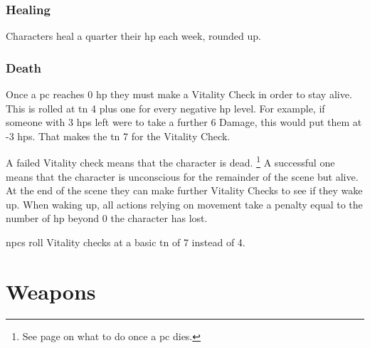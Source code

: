 \begin{multicols}{2}
\subsubsection{Healing}
Characters heal a quarter their \gls{hp} each week, rounded up.

\subsubsection{Death}
Once a \gls{pc} reaches 0 \gls{hp} they must make a Vitality Check in order to stay alive.
This is rolled at \gls{tn} 4 plus one for every negative \gls{hp} level.\iftoggle{verbose}{\footnote{Traits such as Strength do not affect the Vitality check because in a way, they already have.
Stronger characters already have more \gls{hp}, which has already kept them farther from death.}}{}
For example, if someone with 3 \glspl{hp} left were to take a further 6 Damage, this would put them at -3 \glspl{hp}.
That makes the \gls{tn} 7 for the Vitality Check.

A failed Vitality check means that the character is dead.%
\footnote{See page \pageref{pcdeath} on what to do once a \gls{pc} dies.}
A successful one means that the character is unconscious for the remainder of the scene but alive.
At the end of the scene they can make further Vitality Checks to see if they wake up.
When waking up, all actions relying on movement take a penalty equal to the number of \gls{hp} beyond 0 the character has lost.

\glspl{npc} roll Vitality checks at a basic \gls{tn} of 7 instead of 4.


\end{multicols}

\section{Weapons}

